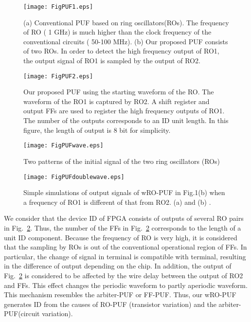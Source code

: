 ﻿\documentclass[aps,preprint,prb,superscriptaddress,amsmath,showpacs,tightenlines]{revtex4}
\begin{document}
\begin{figure}[t]
\begin{center}\texttt{[image: FigPUF1.eps]}
\caption{ 
(a) Conventional PUF based on ring oscillators(ROs). The frequency of RO ( 1 GHz) is much higher than the clock frequency of the conventional circuits ( 50-100 MHz).
(b) Our proposed PUF consists of two ROs. In order to detect the high frequency output of RO1, 
the output signal of RO1 is sampled by the output of RO2.} 
\label{Start}
\end{center}
\end{figure}


\begin{figure}[t]
\begin{center}\texttt{[image: FigPUF2.eps]}
\caption{ 
Our proposed PUF using the starting waveform 
of the RO. The waveform of the RO1 is captured by RO2. 
A shift register and output FFs are used to register the high frequency outputs of RO1.
The number of the outputs corresponds to an
ID unit length. In this figure, the length of output is 8 bit for 
simplicity.} 
\label{allcircuit}
\end{center}
\end{figure}
\begin{figure}
\centering
\texttt{[image: FigPUFwave.eps]}
\caption{
Two patterns of the initial signal of the two ring oscillators (ROs)} 
\label{waveform}
\end{figure}
\begin{figure}
\centering
\texttt{[image: FigPUFdoublewave.eps]}
\caption{
Simple simulations of output signals of wRO-PUF 
in Fig.1(b) when 
a frequency of RO1 is different of that from RO2.
(a)  and (b) .} 
\label{doublewave}
\end{figure}

We consider that the device ID of FPGA 
consists of outputs of several RO pairs in Fig.~\ref{allcircuit}.
Thus, the number of the FFs in Fig.~\ref{allcircuit} corresponds 
to the length of a unit ID component.
Because the frequency of RO is very high, it is considered that 
the sampling by ROs is out of the conventional operational region of FFs.
In particular, the change of signal in  terminal  
is compatible with  terminal, 
resulting in the difference of output depending on the chip.
In addition, the output of Fig.~\ref{allcircuit} is 
considered to be affected by the wire delay between the output of RO2 and FFs.
This effect changes the periodic waveform to partly 
aperiodic waveform.
This mechanism resembles the arbiter-PUF or FF-PUF.
Thus, our wRO-PUF generates ID from the 
causes of RO-PUF (transistor variation) and  the arbiter-PUF(circuit variation).
\end{document}
